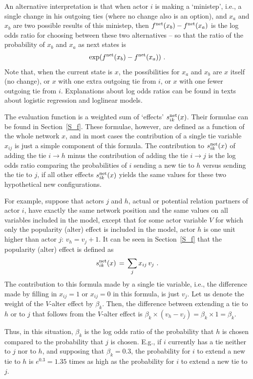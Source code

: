\documentclass[a4paper,fleqn]{article}
\newcommand{\+}{\, + \,}
\begin{document}
{An alternative interpretation is that when actor $i$ is making
a `ministep', i.e., a single change in his outgoing ties
(where no change also is an option), and
$x_a$ and $x_b$ are two possible results of this ministep,
then $f^{\rm net}(x_b) - f^{\rm net}(x_a)$ is the log odds ratio
for choosing between these two alternatives -- so that the ratio
of the probability of $x_b$ and $x_a$ as next states is
\[
  \exp(f^{\rm net}(x_b) - f^{\rm net}(x_a)) \ .
\]
Note that, when the current state is $x$, the possibilities
for $x_a$ and $x_b$ are $x$ itself (no change), or $x$ with one extra
outgoing tie from $i$, or $x$ with one fewer outgoing tie from $i$.
Explanations about log odds ratios can be found
in texts about logistic regression and loglinear models.

The evaluation function is a weighted sum of `effects'
$s^{\rm net}_{ik}(x)$.
Their formulae can be found in Section~\ref{S_f}.
These formulae, however, are defined as a function of the whole
network $x$, and in most cases the contribution of a single tie
variable $x_{ij}$ is just a simple component of this formula.
The contribution to $s^{\rm net}_{ik}(x)$
of adding the tie $i \rightarrow h$ minus the
contribution of adding the tie $i \rightarrow j$ is the log odds ratio
comparing the probabilities of $i$ sending a new tie to $h$ versus
sending the tie to $j$, if all other effects $s^{\rm net}_{ik}(x)$
yields the same values for these two hypothetical new configurations.

For example, suppose that actors $j$ and $h$,
actual or potential relation partners of actor $i$,
have exactly the same network
position and the same values on all variables included in the model,
except that for some actor variable $V$ for which only the
popularity (alter) effect is included in the model,
actor $h$ is one unit higher than actor $j$: $v_h = v_j + 1$.
It can be seen in Section~\ref{S_f} that
the popularity (alter) effect is defined as
\[
s^{\rm net}_{ik}(x) \, = \,  \sum_j x_{ij}\, v_j \ .
\]
The contribution to this formula made by a single tie variable,
i.e., the difference made by filling in $x_{ij} = 1$ or $x_{ij} = 0$
in this formula, is just $v_j$.
Let us denote the weight of the $V$-alter effect by $\beta_k$.
Then, the difference between extending a tie to $h$ or to $j$
that follows from the $V$-alter effect is
$\beta_k \times (v_h - v_j) = \beta_k \times 1 = \beta_k$.

Thus, in this situation, $\beta_k$ is the log odds ratio of the probability
that $h$ is chosen compared to the probability that $j$ is chosen.
E.g., if $i$ currently has a tie neither to $j$ nor to $h$,
and supposing that $\beta_k = 0.3$, the probability for $i$ to
extend a new tie to $h$ is $e^{0.3} = 1.35$ times as high
as the probability for $i$ to extend a new tie to $j$.

}
\end{document}
